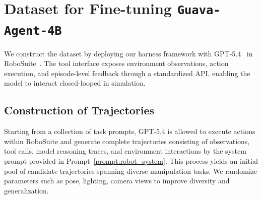 \documentclass{llmxive}
\providecommand{\beginappendix}{\appendix{\huge\sffamily Appendix\par}}
\begin{document}




\tableofcontents

\beginappendix

\appendix

\section{Dataset for Fine-tuning \texttt{Guava-Agent-4B}}
We construct the dataset by deploying our harness framework with GPT-5.4~\cite{openai2026gpt54} in RoboSuite~\citep{robosuite2020}. The tool interface exposes environment observations, action execution, and episode-level feedback through a standardized API, enabling the model to interact closed-looped in simulation.

\subsection{Construction of Trajectories}

Starting from a collection of task prompts, GPT-5.4 is allowed to execute actions within RoboSuite and generate complete trajectories consisting of observations, tool calls, model reasoning traces, and environment interactions by the system prompt provided in Prompt~\ref{prompt:robot_system}. This process yields an initial pool of candidate trajectories spanning diverse manipulation tasks. We randomize parameters such as pose, lighting, camera views to improve diversity and generalization. 
\end{document}
